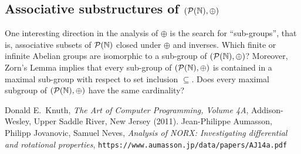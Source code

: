 \documentclass[12pt]{amsart}
\begin{document}
\subsection{Associative substructures of $(\mathcal{P}(\mathbb{N}),\oplus)$} One interesting
direction in the analysis of $\oplus$ is the search for ``sub-groups'', 
that is, associative subsets of $\mathcal{P}(\mathbb{N})$ closed under $\oplus$ and inverses.
Which finite or infinite Abelian groups are isomorphic to
a sub-group of $(\mathcal{P}(\mathbb{N}),\oplus)$? 
Moreover, Zorn's Lemma implies that every sub-group of $(\mathcal{P}(\mathbb{N}),\oplus)$ 
is contained in a maximal sub-group with respect to set inclusion
$\subseteq$. Does every maximal subgroup of $(\mathcal{P}(\mathbb{N}), \oplus)$ 
have the same cardinality?

\footnotesize
\begin{thebibliography}{9}
	 Donald E.~Knuth, {\sl The Art of Computer 
		Programming, Volume 4A}, Addison-Wesley, Upper
		Saddle River, New Jersey (2011).
	 Jean-Philippe Aumasson, Philipp Jovanovic, Samuel Neves, {\sl
		Analysis of NORX: Investigating differential and rotational properties},
		{\tt https://www.aumasson.jp/data/papers/AJ14a.pdf}
\end{thebibliography}
\end{document}
